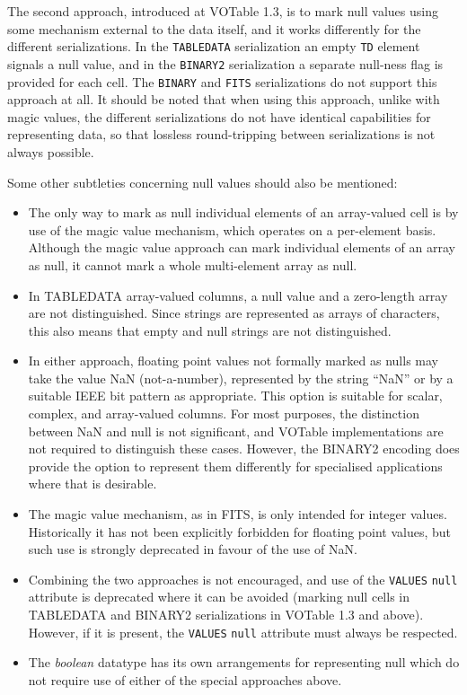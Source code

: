 \documentclass[11pt,a4paper]{ivoa}
\let\fg=\color
\def\attr#1{{\tt{\fg{DarkRed}#1}}}
\def\elem#1{{\tt{\fg{DarkRed}#1}}}
\begin{document}
{The second approach, introduced at VOTable 1.3,
is to mark null values using some mechanism external
to the data itself, and it works differently for the different serializations.
In the \elem{TABLEDATA} serialization
an empty \elem{TD} element signals a null value, and
in the \elem{BINARY2} serialization
a separate null-ness flag is provided for each cell.
The \elem{BINARY} and \elem{FITS} serializations do not support this approach
at all.
It should be noted that when using this approach, unlike with magic values,
the different serializations do not have identical capabilities for
representing data, so that lossless round-tripping between serializations
is not always possible.

Some other subtleties concerning null values should also be mentioned:
\begin{itemize}
\item The only way to mark as null individual elements of an array-valued cell
      is by use of the magic value mechanism, which operates on a
      per-element basis.
      Although the magic value approach can mark individual elements
      of an array as null, it cannot mark a whole multi-element array as null.
\item In TABLEDATA array-valued columns, a null value and a zero-length
      array are not distinguished.
      Since strings are represented as arrays of characters, this also
      means that empty and null strings are not distinguished.
\item In either approach, floating point values not formally marked as nulls
      may take the value NaN (not-a-number),
      represented by the string ``NaN'' or by a suitable IEEE bit pattern
      as appropriate.
      This option is suitable for scalar, complex, and array-valued columns.
      For most purposes, the distinction between NaN and null is not
      significant, and VOTable implementations are not required to distinguish
      these cases.  However, the BINARY2 encoding does provide the option
      to represent them differently for specialised applications where
      that is desirable.
\item The magic value mechanism, as in FITS, is only intended for integer
      values.  Historically it has not been explicitly forbidden for
      floating point values, but such use is strongly deprecated in favour
      of the use of NaN.
\item Combining the two approaches is not encouraged,
      and use of the \elem{VALUES} \attr{null} attribute is deprecated
      where it can be avoided (marking null cells in TABLEDATA and BINARY2
      serializations in VOTable 1.3 and above).
      However, if it is present, the \elem{VALUES} \attr{null} attribute
      must always be respected.
\item The {\em boolean} datatype has its own arrangements for representing
      null which do not require use of either of the special approaches above.
\end{itemize}


}
\end{document}
